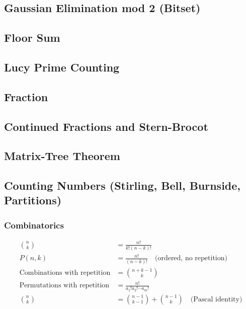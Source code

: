 \documentclass[10pt,letterpaper,landscape,twocolumn]{article}
\begin{document}
\subsection{Gaussian Elimination mod 2 (Bitset)}

\subsection{Floor Sum}

\subsection{Lucy Prime Counting}

\subsection{Fraction}

\subsection{Continued Fractions and Stern-Brocot}

\subsection{Matrix-Tree Theorem}

\subsection{Counting Numbers (Stirling, Bell, Burnside, Partitions)}


\subsubsection{Combinatorics}
\begin{align*}
\binom{n}{k} &= \frac{n!}{k!(n-k)!} \\
P(n,k) &= \frac{n!}{(n-k)!} \quad \text{(ordered, no repetition)} \\
\text{Combinations with repetition} &= \binom{n+k-1}{k} \\
\text{Permutations with repetition} &= \frac{n!}{a_1!a_2!\cdots a_m!} \\
\binom{n}{k} &= \binom{n-1}{k-1} + \binom{n-1}{k} \quad \text{(Pascal identity)}
\end{align*}
\end{document}
